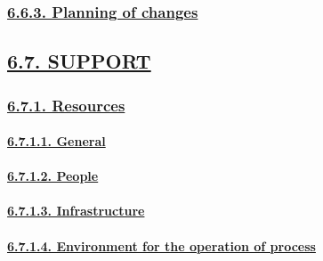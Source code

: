 \documentclass[
]{article}
\begin{document}
\hypertarget{planning-of-changes}{%
\subsubsection{\texorpdfstring{\protect\hyperlink{planning-of-changes-1}{6.6.3.
Planning of
changes}}{6.6.3. Planning of changes}}\label{planning-of-changes}}

\hypertarget{support}{%
\subsection{\texorpdfstring{\protect\hyperlink{support-1}{6.7.
SUPPORT}}{6.7. SUPPORT}}\label{support}}

\hypertarget{resources}{%
\subsubsection{\texorpdfstring{\protect\hyperlink{resources-1}{6.7.1.
Resources}}{6.7.1. Resources}}\label{resources}}

\hypertarget{general-1}{%
\paragraph{\texorpdfstring{\protect\hyperlink{general-10}{6.7.1.1.
General}}{6.7.1.1. General}}\label{general-1}}

\hypertarget{people}{%
\paragraph{\texorpdfstring{\protect\hyperlink{people-1}{6.7.1.2.
People}}{6.7.1.2. People}}\label{people}}

\hypertarget{infrastructure}{%
\paragraph{\texorpdfstring{\protect\hyperlink{infrastructure-1}{6.7.1.3.
Infrastructure}}{6.7.1.3. Infrastructure}}\label{infrastructure}}

\hypertarget{environment-for-the-operation-of-process}{%
\paragraph{\texorpdfstring{\protect\hyperlink{environment-for-the-operation-of-process-1}{6.7.1.4.
Environment for the operation of
process}}{6.7.1.4. Environment for the operation of process}}\label{environment-for-the-operation-of-process}}
\end{document}
